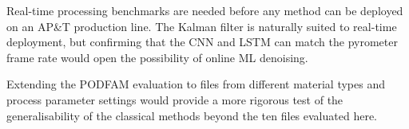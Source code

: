 Real-time processing benchmarks are needed before any method can be deployed on
an AP\&T production line. The Kalman filter is naturally suited to real-time
deployment, but confirming that the CNN and LSTM can match the pyrometer frame
rate would open the possibility of online ML denoising.

Extending the PODFAM evaluation to files from different material types and process
parameter settings would provide a more rigorous test of the generalisability of
the classical methods beyond the ten files evaluated here.

\let\cleardoublepage\clearpage
